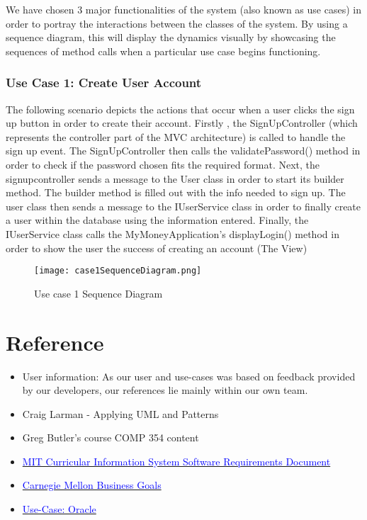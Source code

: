 \documentclass[12pt]{article}
\begin{document}
We have chosen 3 major functionalities of the system (also known as use cases) in order to portray the interactions between the classes of the system. By using a sequence diagram, this will display the dynamics visually by showcasing the sequences of method calls when a particular use case begins functioning. 

\clearpage

\subsubsection{Use Case 1: Create User Account}

The following scenario depicts the actions that occur when a user clicks the sign up button in order to create their account. Firstly , the SignUpController (which represents the controller part of the MVC architecture) is called to handle the sign up event. The SignUpController then calls the validatePassword() method in order to check if the password chosen fits the required format. Next, the signupcontroller sends a message to the User class in order to start its builder method. The builder method is filled out with the info needed to sign up. The user class then sends a message to the IUserService class in order to finally create a user within the database using the information entered. Finally, the IUserService class calls the MyMoneyApplication's displayLogin() method in order to show the user the success of creating an account (The View)

\begin{figure}[H]
\texttt{[image: case1SequenceDiagram.png]}
\caption{Use case 1 Sequence Diagram}
\label{fig:use-case-1-sequence-diagram}
\end{figure}

\clearpage

\section{Reference}

\begin{itemize}
\item User information: As our user and use-cases was based on feedback provided by our developers, our references lie mainly within our own team.
\item Craig Larman - Applying UML and Patterns
\item Greg Butler's course COMP 354 content
\item \href{http://web.mit.edu/ssit/cis/CISRequirements.html}{\textcolor{blue}{MIT Curricular Information System
Software Requirements Document}}
\item \href{https://resources.sei.cmu.edu/asset_files/TechnicalReport/2005_005_001_14621.pdf}{\textcolor{blue}{Carnegie Mellon Business Goals}}
\item \href{http://www.oracle.com/technetwork/testcontent/gettingstartedwithusecasemodeling-133857.pdf}{\textcolor{blue}{Use-Case: Oracle }}

\end{itemize}
\end{document}
